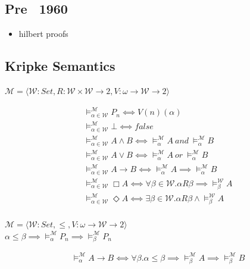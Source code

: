 \documentclass[aspectratio=169]{beamer}
\begin{document}
\subsection{Pre ~1960}
\begin{frame}
    \begin{itemize}
        \item hilbert proofs
    \end{itemize}
\end{frame}
\subsection{Kripke Semantics}
\begin{frame}
    \begin{definition}
        $\mathcal{M} = ⟨\mathcal{W}  : Set,
        R : \mathcal{W} × \mathcal{W} → 2,
        V : ω → \mathcal{W} → 2⟩$
    \end{definition}
    \begin{definition}
        \begin{align*}
            &⊨^{\mathcal{M}}_{α ∈ \mathcal{W}} P_n ⟺ V(n)(α) \\
            &⊨^{\mathcal{M}}_{α ∈ \mathcal{W}} ⊥ ⟺ false \\
            &⊨^{\mathcal{M}}_{α ∈ \mathcal{W}} A \land B ⟺ ⊨^{\mathcal{M}}_α A~and~⊨^{\mathcal{M}}_{α} B\\
            &⊨^{\mathcal{M}}_{α ∈ \mathcal{W}} A \lor B ⟺ ⊨^{\mathcal{M}}_α A~or~⊨^{\mathcal{M}}_{α} B\\
            &⊨^{\mathcal{M}}_{α ∈ \mathcal{W}} A → B ⟺ ⊨^{\mathcal{M}}_α A ⟹ ⊨^{\mathcal{M}}_{α} B\\
            &⊨^{\mathcal{M}}_{α ∈ \mathcal{W}} \Box A ⟺ ∀β∈\mathcal{W}.αRβ ⟹ ⊨^{\mathcal{W}}_{β} A \\
            &⊨^{\mathcal{M}}_{α ∈ \mathcal{W}} \Diamond A ⟺ ∃β∈\mathcal{W}.αRβ \land ⊨^{\mathcal{W}}_{β} A \\
        \end{align*}
    \end{definition}
\end{frame}
\begin{frame}
    \begin{definition}
        $\mathcal{M} = ⟨\mathcal{W}  : Set,
        ≤,
        V : ω → \mathcal{W} → 2⟩$ \\
        $α≤β ⟹ ⊨^{\mathcal{M}}_α P_n ⟹ ⊨^{\mathcal{M}}_β P_n$
    \end{definition}
    \begin{definition}
        \begin{align*}
            &⊨^{\mathcal{M}}_α A → B ⟺ ∀β.α≤β ⟹ ⊨^{\mathcal{M}}_β A ⟹ ⊨^{\mathcal{M}}_β B \\
        \end{align*}
    \end{definition}
\end{frame}
\end{document}
